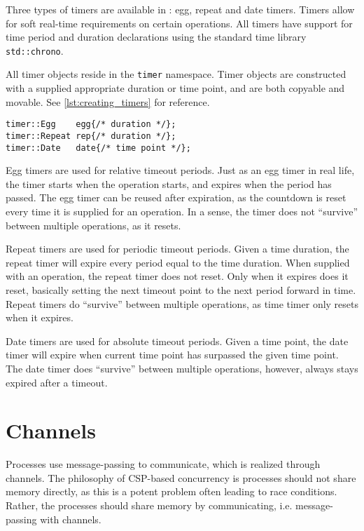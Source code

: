 Three types of timers are available in \Proxc{}: egg, repeat and date timers. Timers allow for soft real\hyp{}time requirements on certain operations. All timers have support for time period and duration declarations using the standard time library \lstinline[style={CustomC++}]|std::chrono|.

All timer objects reside in the \lstinline[style={CustomC++}]|timer| namespace. Timer objects are constructed with a supplied appropriate duration or time point, and are both copyable and movable. See \cref{lst:creating_timers} for reference. 

\begin{lstfloat}
\begin{lstlisting}[caption={Constructing different timers.}, label={lst:creating_timers}, style={CustomC++}, xleftmargin={2em}]
timer::Egg    egg{/* duration */};
timer::Repeat rep{/* duration */};
timer::Date   date{/* time point */};
\end{lstlisting}
\end{lstfloat}

Egg timers are used for relative timeout periods. Just as an egg timer in real life, the timer starts when the operation starts, and expires when the period has passed. The egg timer can be reused after expiration, as the countdown is reset every time it is supplied for an operation. In a sense, the timer does not ``survive'' between multiple operations, as it resets.

Repeat timers are used for periodic timeout periods. Given a time duration, the repeat timer will expire every period equal to the time duration. When supplied with an operation, the repeat timer does not reset. Only when it expires does it reset, basically setting the next timeout point to the next period forward in time. Repeat timers do ``survive'' between multiple operations, as time timer only resets when it expires. 

Date timers are used for absolute timeout periods. Given a time point, the date timer will expire when current time point has surpassed the given time point. The date timer does ``survive'' between multiple operations, however, always stays expired after a timeout. 


\section{Channels}


Processes use message\hyp{}passing to communicate, which is realized through channels. The philosophy of CSP\hyp{}based concurrency is processes should not share memory directly, as this is a potent problem often leading to race conditions. Rather, the processes should share memory by communicating, i.e. message\hyp{}passing with channels.

